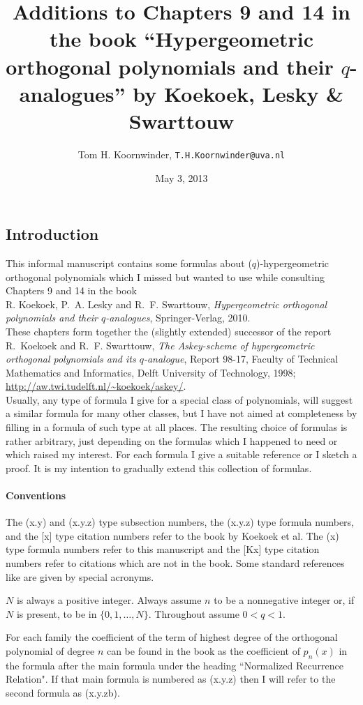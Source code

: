 \documentclass[twoside,11pt]{article}
\newcommand\sa{\smallskipamount}
\newcommand\sLP{\\[\sa]}
\newcommand\sPP{\\[\sa]\indent}
\begin{document}
\title{Additions to Chapters 9 and 14 in the book
``Hypergeometric orthogonal polynomials and their $q$-analogues''
by Koekoek, Lesky \& Swarttouw}
\author{Tom H. Koornwinder,
\small\tt T.H.Koornwinder@uva.nl}

\date{May 3, 2013}
\maketitle
\subsection*{Introduction}
This informal manuscript contains some formulas about ($q$)-hypergeometric
orthogonal polynomials which I missed but wanted to use
while consulting Chapters 9 and 14 in the book
\sLP
R. Koekoek, P.~A. Lesky and R.~F. Swarttouw,
{\em Hypergeometric orthogonal polynomials and their $q$-analogues},
Springer-Verlag, 2010.
\sLP
These chapters form together the (slightly extended) successor of the report
\sLP
R.~Koekoek and  R.~F. Swarttouw,
{\em The Askey-scheme of hypergeometric orthogonal
polynomials and its $q$-analogue},
Report 98-17, Faculty of Technical Mathematics and Informatics,
Delft University of Technology, 1998;
\url{http://aw.twi.tudelft.nl/~koekoek/askey/}.
\sPP
Usually, any type of formula I give for a special class of polynomials, will suggest
a similar formula for many other classes, but I have not aimed at completeness
by filling in a formula of such type at all places. The resulting choice of formulas is
rather arbitrary, just depending on the formulas which I happened to need or which raised my interest.
For each formula I give  a suitable reference or I sketch a
proof.
It is my intention to gradually extend this collection of formulas.
%
\paragraph{Conventions}
The (x.y) and (x.y.z) type subsection numbers, the
(x.y.z) type formula numbers, and the [x] type citation numbers
refer to the book by Koekoek et al.
The (x) type formula numbers refer to this manuscript and the [Kx] type citation numbers refer to citations which are not in the book.
Some standard references like \cite{DLMF} are given by special acronyms.

$N$ is always a positive integer. Always assume $n$ to be a nonnegative
integer or, if $N$ is present, to be in $\{0,1,\ldots,N\}$.
Throughout assume $0<q<1$.

For each family the coefficient of the term of highest degree of the
orthogonal polynomial of degree $n$ can be found in the book as the
coefficient of $p_n(x)$ in the formula after the main formula under
the heading ``Normalized Recurrence Relation". If that main formula is numbered
as (x.y.z) then I will refer to the second formula as (x.y.zb).
%
\end{document}
